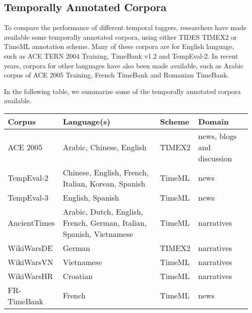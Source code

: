 \subsection{Temporally Annotated Corpora} \label{tactac}
To compare the performance of different temporal taggers, researchers have made available some temporally annotated corpora, using either TIDES TIMEX2 or TimeML annotation scheme. Many of these corpora are for English language, such as ACE TERN 2004 Training, TimeBank v1.2 and TempEval-2. In recent years, corpora for other languages have also been made available, such as Arabic corpus of ACE 2005 Training, French TimeBank and Romanian TimeBank.

In the following table, we summarize some of the temporally annotated corpora available.
  
\begin{table}[H] \label{the-ttaggers-corpora-table}
	\centering
	\begin{threeparttable}
		\begin{tabularx}{\linewidth}{||l   >{\raggedright\arraybackslash}X   >{\raggedright\arraybackslash}p{0.6in}   >{\raggedright\arraybackslash}p{1in}||} 
			\hline
			\textbf{Corpus} & \textbf{Language(s)} & \textbf{Scheme} & \textbf{Domain} \\ [0.5ex] 
			\hline\hline
			ACE 2005 \cite{walker2006ace} & Arabic, Chinese, English & TIMEX2 & news, blogs and discussion \\
			\hline
			TempEval-2 \cite{DBLP:conf/semeval/VerhagenSCP10} & Chinese, English, French, Italian, Korean, Spanish & TimeML & news \\
			TempEval-3 \cite{DBLP:conf/semeval/UzZamanLDAVP13} & English, Spanish & TimeML & news \\
			\hline
			AncientTimes \cite{DBLP:conf/lrec/StrotgenBZACG14}& Arabic, Dutch, English, French, German, Italian, Spanish, Vietnamese & TimeML & narratives \\
			\hline
			WikiWarsDE \cite{strotgen2011wikiwarsde} & German & TIMEX2 & narratives \\
			WikiWarsVN \cite{strotgen2014time} & Vietnamese & TimeML & narratives \\
			WikiWarsHR \cite{skukan2014heideltime} & Croatian & TimeML & narratives \\
			\hline
			FR-TimeBank \cite{bittar2011french} & French & TimeML & news \\

\end{tabularx}
\end{threeparttable}
\end{table}
